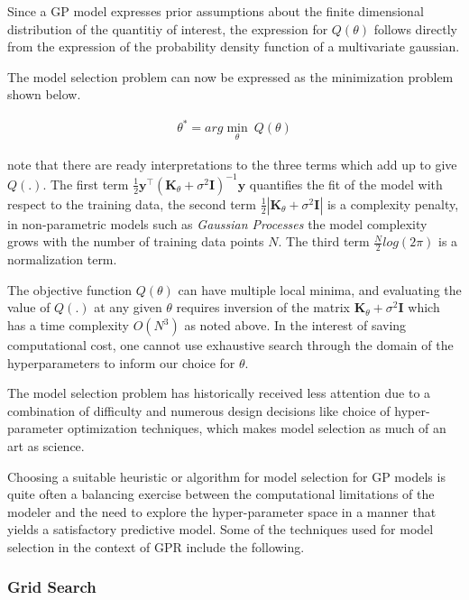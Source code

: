 \documentclass{article}
\begin{document}
Since a GP model expresses prior assumptions about the finite
dimensional distribution of the quantitiy of interest, the expression
for $Q(\theta)$ follows directly from the expression of the
probability density function of a multivariate gaussian.

The model selection problem can now be expressed as the minimization
problem shown below.

\begin{align*}
  \theta^* = arg\min_{\theta} \ Q(\theta)
\end{align*}

\citet{Rasmussen:2005:GPM:1162254} note that there are ready
interpretations to the three terms which add up to give $Q(.)$. The
first term $\frac{1}{2} \mathbf{y}^\intercal (\mathbf{K}_\theta +
\sigma^{2} \mathbf{I})^{-1} \mathbf{y}$ quantifies the fit of the
model with respect to the training data, the second term
$\frac{1}{2}|\mathbf{K}_\theta + \sigma^{2} \mathbf{I}|$ is a
complexity penalty, in non-parametric models such as \emph{Gaussian
  Processes} the model complexity grows with the number of training
data points $N$. The third term $\frac{N}{2}log(2\pi)$ is a
normalization term.

The objective function $Q(\theta)$ can have multiple local minima, and
evaluating the value of $Q(.)$ at any given $\theta$ requires
inversion of the matrix $\mathbf{K}_\theta + \sigma^{2} \mathbf{I}$
which has a time complexity $O(N^3)$ as noted above. In the interest
of saving computational cost, one cannot use exhaustive search through
the domain of the hyperparameters to inform our choice for $\theta$.

The model selection problem has historically received less attention
due to a combination of difficulty and numerous design decisions like
choice of hyper-parameter optimization techniques, which makes model
selection as much of an art as science. 

Choosing a suitable heuristic or algorithm for model selection for GP
models is quite often a balancing exercise between the computational
limitations of the modeler and the need to explore the hyper-parameter
space in a manner that yields a satisfactory predictive model. Some of
the techniques used for model selection in the context of GPR include
the following.


\subsubsection*{Grid Search}
\end{document}
